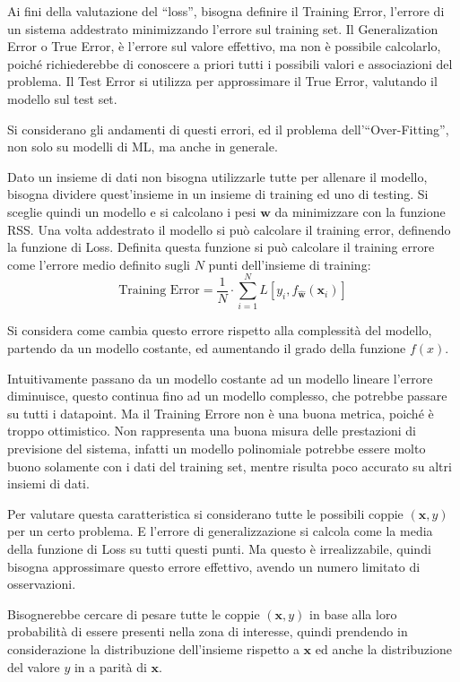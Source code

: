 \documentclass{article}
\numberwithin{equation}{subsection}
\newcommand{\vect}[1]{\boldsymbol{\mathbf{#1}}}
\begin{document}
Ai fini della valutazione del ``loss'', bisogna definire il Training Error, l'errore di 
un sistema addestrato minimizzando l'errore sul training set. 
Il Generalization Error o True Error, è l'errore sul valore effettivo, ma non è possibile 
calcolarlo, poiché richiederebbe di conoscere a priori tutti i possibili valori e associazioni del problema. Il Test Error si utilizza per approssimare il True Error, 
valutando il modello sul test set. 

Si considerano gli andamenti di questi errori, ed il problema dell'``Over-Fitting'', non solo su modelli di ML, ma anche in generale. 

Dato un insieme di dati non bisogna utilizzarle tutte per allenare il modello, bisogna 
dividere quest'insieme in un insieme di training ed uno di testing. Si sceglie quindi 
un modello e si calcolano i pesi $\vect{w}$ da minimizzare con la funzione RSS. 
Una volta addestrato il modello si può calcolare il training error, definendo la funzione di Loss. Definita questa funzione si può calcolare il training errore come l'errore medio definito sugli $N$ punti dell'insieme di training:
\begin{equation}
    \text{Training Error}=\displaystyle\frac{1}{N}\cdot\sum_{i=1}^NL[y_i,f_{\vect{\hat{w}}}(\vect{x}_i)]
\end{equation}

Si considera come cambia questo errore rispetto alla complessità del modello, partendo da un modello costante, ed aumentando il grado della funzione $f(x)$. 

Intuitivamente passano da un modello costante ad un modello lineare l'errore diminuisce, 
questo continua fino ad un modello complesso, che potrebbe passare su tutti i datapoint. 
Ma il Training Errore non è una buona metrica, poiché è troppo ottimistico. Non rappresenta una buona misura delle prestazioni di previsione del sistema, infatti un modello polinomiale potrebbe essere molto buono solamente con i dati del training set, mentre risulta 
poco accurato su altri insiemi di dati. 

Per valutare questa caratteristica si considerano tutte le possibili coppie $(\vect{x},y)$ 
per un certo problema. E l'errore di generalizzazione si calcola come la media della funzione di Loss su tutti questi punti. Ma questo è irrealizzabile, quindi bisogna approssimare questo errore effettivo, avendo un numero limitato di osservazioni. 

Bisognerebbe cercare di pesare tutte le coppie $(\vect{x}, y)$ in base alla loro probabilità di essere presenti nella zona di interesse, quindi prendendo in considerazione la 
distribuzione dell'insieme rispetto a $\vect{x}$ ed anche la distribuzione del valore $y$ in a parità di $\vect{x}$. 
\end{document}
